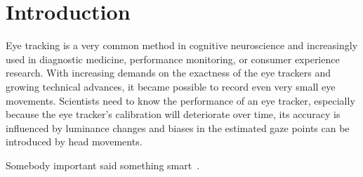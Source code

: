 \section{Introduction}

Eye tracking is a very common method in cognitive neuroscience and increasingly used in diagnostic medicine, performance monitoring, or consumer experience research.
With increasing demands on the exactness of the eye trackers and growing technical advances, it became possible to record even very small eye movements.
Scientists need to know the performance of an eye tracker, especially because the eye tracker's calibration will deteriorate over time, its accuracy is influenced by luminance changes and biases in the estimated gaze points can be introduced by head movements.


Somebody important said something smart~\citep{thaler_what_2013}.